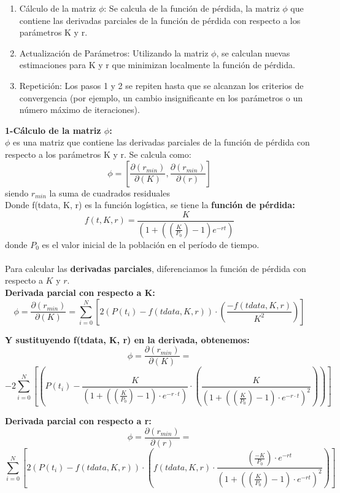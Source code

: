 \documentclass[a4paper,10pt,twocolumn]{article}
\begin{document}
\begin{enumerate}
	\item \small{Cálculo de la matriz $\phi$: Se calcula de la función de pérdida, la matriz $\phi$ que contiene las derivadas parciales de la función de pérdida con respecto a los parámetros K y r.}
	\item \small{Actualización de Parámetros: Utilizando la matriz $\phi$, se calculan nuevas estimaciones para K y r que minimizan localmente la función de pérdida.}
	\item \small{Repetición: Los pasos 1 y 2 se repiten hasta que se alcanzan los criterios de convergencia (por ejemplo, un cambio insignificante en los parámetros o un número máximo de iteraciones).}
\end{enumerate}

\textbf{1-Cálculo de la matriz $\phi$:}\\
$\phi$ es una matriz que contiene las derivadas parciales de la función de pérdida con respecto a los parámetros K y r. Se calcula como: 
	$$\phi = [\frac{\partial(r_{min})}{\partial(K)}, \frac{\partial(r_{min})}{\partial(r)}]$$
\small{siendo $r_{min}$ la suma de cuadrados residuales}\\

Donde f(tdata, K, r) es la función logística, se tiene la \textbf{función de pérdida:}
$$f(t, K, r) = \frac{K}{(1 + ((\frac{K}{P_{0}}) - 1)e^{-rt})}$$
donde $P_{0}$ es el valor inicial de la población en el período de tiempo. \\\\
\small{Para calcular las \textbf{derivadas parciales}, diferenciamos la función de pérdida con respecto a $K$ y $r$.\\}
\textbf{Derivada parcial con respecto a K:}
\small{$$\phi = \frac{\partial(r_{min})}{\partial(K)} = \sum_{i=0}^{N}[2(P(t_{i}) - f(tdata, K, r)) \cdot (\frac{-f(tdata, K, r)}{K^{2}})]$$}

\textbf{Y sustituyendo  f(tdata, K, r) en la derivada, obtenemos:}
\small{$$\phi = \frac{\partial(r_{min})}{\partial(K)} =$$} 
\tiny{$$-2\sum_{i=0}^{N}[(P(t_{i}) - \frac{K}{(1 + ((\frac{K}{P_{0}}) - 1) \cdot e^{-r \cdot t})} \cdot (\frac{K}{(1 + ((\frac{K}{P_{0}}) - 1) \cdot e^{-r \cdot t})^{2}}))]$$}    

\small{\textbf{Derivada parcial con respecto a r:}}
$$\phi = \frac{\partial(r_{min})}{\partial(r)} = $$ 
\tiny{$$\sum_{i=0}^{N}[2(P(t_{i}) - f(tdata, K, r)) \cdot (f(tdata, K, r) \cdot \frac{(\frac{-K}{P_{0}}) \cdot e^{-rt}}{(1 + ((\frac{K}{P_{0}}) - 1) \cdot e^{-rt})^{2}})]$$}
\end{document}

